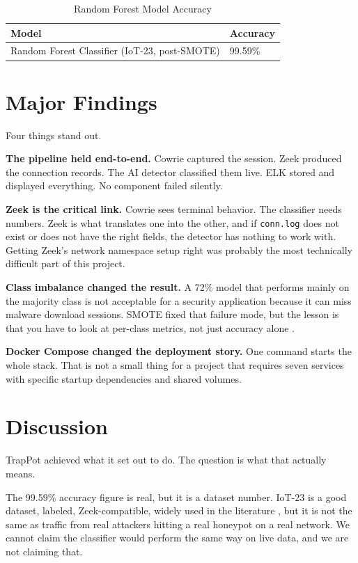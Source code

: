 \begin{table}[htbp]
\centering
\caption{Random Forest Model Accuracy}
\label{tab:model_accuracy}
\begin{tabular}{|p{6cm}|p{4cm}|}
\hline
\textbf{Model} & \textbf{Accuracy} \\
\hline
Random Forest Classifier (IoT-23, post-SMOTE) & 99.59\% \\
\hline
\end{tabular}
\end{table}

\section{Major Findings}
\label{sec:major_findings}

Four things stand out.

\textbf{The pipeline held end-to-end.} Cowrie captured the session. Zeek produced the connection records. The AI detector classified them live. ELK stored and displayed everything. No component failed silently.

\textbf{Zeek is the critical link.} Cowrie sees terminal behavior. The classifier needs numbers. Zeek is what translates one into the other, and if \texttt{conn.log} does not exist or does not have the right fields, the detector has nothing to work with. Getting Zeek's network namespace setup right was probably the most technically difficult part of this project.

\textbf{Class imbalance changed the result.} A 72\% model that performs mainly on the majority class is not acceptable for a security application because it can miss malware download sessions. SMOTE fixed that failure mode, but the lesson is that you have to look at per-class metrics, not just accuracy alone \cite{saied2023comparative,karim2024efficient}.

\textbf{Docker Compose changed the deployment story.} One command starts the whole stack. That is not a small thing for a project that requires seven services with specific startup dependencies and shared volumes.

\section{Discussion}
\label{sec:discussion}

TrapPot achieved what it set out to do. The question is what that actually means.

The 99.59\% accuracy figure is real, but it is a dataset number. IoT-23 is a good dataset, labeled, Zeek-compatible, widely used in the literature \cite{iot23dataset,dekeersmaeker2023survey}, but it is not the same as traffic from real attackers hitting a real honeypot on a real network. We cannot claim the classifier would perform the same way on live data, and we are not claiming that.

